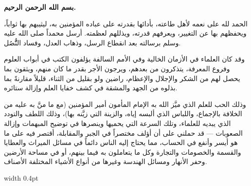 \documentclass[11pt,a4paper,openany,oneside]{book}
\begin{document}
\noindent\begin{minipage}[t]{0.48\textwidth}
\raggedleft

\begin{Arabic}
\textbf{بسم الله الرحمن الرحيم.}

الحمد لله على نعمه لأهل طاعته، بأدائها بقدرته على عباده المؤمنين به، ليثيبهم بها ثواباً، ويحفظهم بها عن التغيير، ويعرفهم قدرته، ويذللهم لعظمته. أرسل محمداً صلى الله عليه وسلم برسالته بعد انقطاع الرسل، وذهاب العدل، وفساد النُُّصُل.

وقد كان العلماء في الأزمان الخالية وفي الأمم السالفة يؤلفون الكتب في أبواب العلوم وفروع المعرفة، يتذكرون من بعدهم، ويرجون الأجر بقدر ما كان منهم، ويثقون بما يحصل لهم من الشكر والإجلال والإعظام، راضين ولو بقليل من الثناء، قليلاً مقارنةً بما بذلوه من الجهد والمشقة في كشف خفايا العلم وإزالة ستائره.

وذلك الحب للعلم الذي ميَّز الله به الإمام المأمون أمير المؤمنين (مع ما منَّ به عليه من الخلافة بالإجماع، واللباس الذي ألبسه إياه، والزينة التي زيَّنه بها)، وذلك اللطف والتودد الذي يبديه للعلماء، وتلك السرعة التي يحميها وينصرها في توضيح المبهمات وإزالة الصعوبات — قد حملني على أن أؤلف مختصراً في الجبر والمقابلة، أقتصر فيه على ما هو أيسر وأنفع في الحساب، مما يحتاج إليه الناس دائماً في مسائل الميراث والعطايا والقسمة والخصومات والتجارة وكل ما يتعاملون به فيما بينهم، أو في مساحة الأرضين وحفر الأنهار ومسائل الهندسة وغيرها من أنواع الأشياء المختلفة الأصناف.
\end{Arabic}

\end{minipage}%
\hfill\vrule width 0.4pt\hfill
\end{document}

